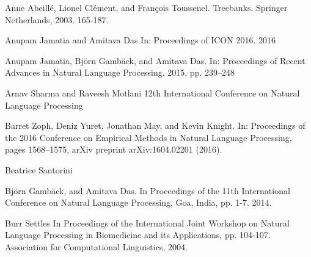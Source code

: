 \documentclass[11pt,a4paper]{article}
\begin{document}
\begin{thebibliography}{}

Anne Abeill\'{e}, Lionel Cl\'{e}ment, and Fran\c{c}ois Toussenel.
\newblock Treebanks. Springer Netherlands, 2003. 165-187.

Anupam Jamatia and Amitava Das
\newblock In: Proceedings of ICON 2016. 2016 

Anupam Jamatia, Bj\"{o}rn Gamb\"{a}ck, and Amitava Das.
\newblock In: Proceedings of Recent Advances in Natural Language Processing. 2015, pp. 239–248

Arnav Sharma and Raveesh Motlani
\newblock 12th International Conference on Natural Language Processing

Barret Zoph, Deniz Yuret, Jonathan May, and Kevin Knight.
\newblock In: Proceedings of the 2016 Conference on Empirical Methods in Natural Language Processing, pages 1568–1575, arXiv preprint arXiv:1604.02201 (2016).


Beatrice Santorini

Bj\"{o}rn Gamb\"{a}ck, and Amitava Das.
\newblock In Proceedings of the 11th International Conference on Natural Language Processing, Goa, India, pp. 1-7. 2014.


Burr Settles
\newblock In Proceedings of the International Joint Workshop on Natural Language Processing in Biomedicine and its Applications, pp. 104-107. Association for Computational Linguistics, 2004.


\end{thebibliography}
\end{document}
